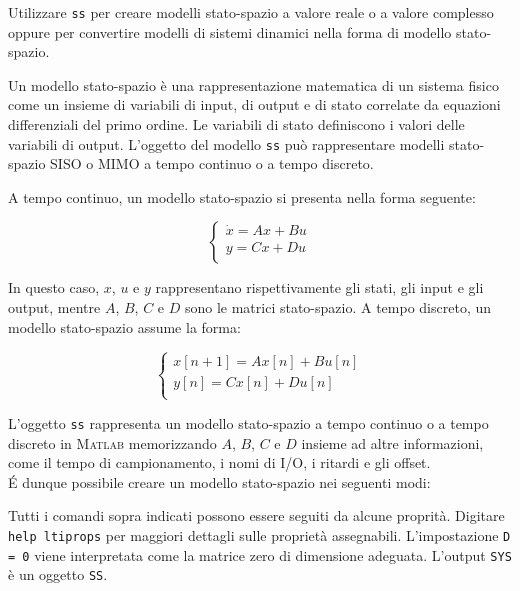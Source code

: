 \documentclass[../main.tex]{subfiles}
\begin{document}
Utilizzare \texttt{ss} per creare modelli stato-spazio a valore reale o a valore complesso oppure per convertire modelli di sistemi dinamici nella forma di modello stato-spazio.

Un modello stato-spazio è una rappresentazione matematica di un sistema fisico come un insieme di variabili di input, di output e di stato correlate da equazioni differenziali del primo ordine. Le variabili di stato definiscono i valori delle variabili di output. L'oggetto del modello \texttt{ss} può rappresentare modelli stato-spazio SISO o MIMO a tempo continuo o a tempo discreto.

A tempo continuo, un modello stato-spazio si presenta nella forma seguente:

\begin{equation}
\begin{cases}
	\dot x = Ax + Bu \\
	y = Cx + Du \\ 
\end{cases}	
\end{equation}

In questo caso, $x$, $u$ e $y$ rappresentano rispettivamente gli stati, gli input e gli output, mentre $A$, $B$, $C$ e $D$ sono le matrici stato-spazio. A tempo discreto, un modello stato-spazio assume la forma:

\begin{equation}
\begin{cases}
	x[n+1] = Ax[n] + Bu[n] \\
	y[n] = Cx[n] + Du[n] \\ 
\end{cases}	
\end{equation}

L'oggetto \texttt{ss} rappresenta un modello stato-spazio a tempo continuo o a tempo discreto in \textsc{Matlab} memorizzando $A$, $B$, $C$ e $D$ insieme ad altre informazioni, come il tempo di campionamento, i nomi di I/O, i ritardi e gli offset.\\

É dunque possibile creare un modello stato-spazio nei seguenti modi:



Tutti i comandi sopra indicati possono essere seguiti da alcune proprità. Digitare \texttt{help ltiprops} per maggiori dettagli sulle proprietà assegnabili. L'impostazione \texttt{D = 0} viene interpretata come la matrice zero di dimensione adeguata. L'output \texttt{SYS} è un oggetto \texttt{SS}.
\end{document}

